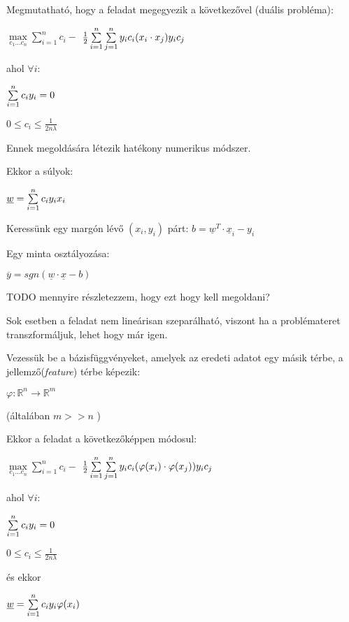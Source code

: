 \noindent
Megmutatható, hogy a feladat megegyezik a következővel (duális probléma): 

$ \max\limits_{c_1 \dots c_n} \sum\limits_{i=1}^{n}c_i -  $
$ \frac{1}{2}\sum\limits_{{i}=1}^{n}\sum\limits_{{j}=1}^{n} y_i c_i (x_i \cdot x_j) y_i c_j $

\noindent
ahol $ \forall i: $

$  \sum\limits_{{i}=1}^{n} c_i y_i = 0 $

$ 0 \leq c_i \leq \frac{1}{2n\lambda} $

\noindent
Ennek megoldására létezik hatékony numerikus módszer.

\noindent
Ekkor a súlyok:

$ \underline{w} = \sum\limits_{{i}=1}^{n} c_i y_i x_i $

\noindent
Keressünk egy margón lévő $ (x_i, y_i) $ párt:
$ b = \underline{w}^T \cdot \underline{x}_i  - y_i$

\noindent
Egy minta osztályozása:

$ \overline{y} = sgn(\underline{w} \cdot \underline{x} - b) $

\noindent
TODO mennyire részletezzem, hogy ezt hogy kell megoldani?






Sok esetben a feladat nem lineárisan szeparálható, viszont ha a problémateret
transzformáljuk, lehet hogy már igen. 

Vezessük be a bázisfüggvényeket, amelyek az eredeti adatot egy másik térbe,
a jellemző(\textit{feature}) térbe képezik:


$ \varphi : \mathbb{R}^n \rightarrow \mathbb{R}^m $

(általában $ m >> n $ )


\noindent
Ekkor a feladat a következőképpen módosul:

$ \max\limits_{c_1 \dots c_n} \sum\limits_{i=1}^{n}c_i -  $
$ \frac{1}{2}\sum\limits_{{i}=1}^{n}\sum\limits_{{j}=1}^{n} y_i c_i (\varphi(x_i) \cdot \varphi(x_j)) y_i c_j $

\noindent
ahol $ \forall i: $

$  \sum\limits_{{i}=1}^{n} c_i y_i = 0 $

$ 0 \leq c_i \leq \frac{1}{2n\lambda} $

\noindent
és ekkor

$ \underline{w} = \sum\limits_{{i}=1}^{n} c_i y_i \varphi(x_i) $

